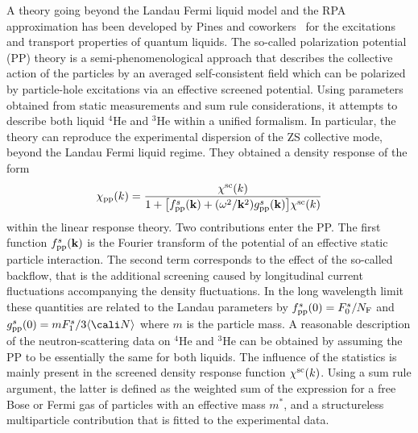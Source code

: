 \documentclass[showpacs,amsmath,twocolumn,floatfix]{revtex4-1}
\begin{document}
A theory going beyond the Landau Fermi liquid model and the RPA approximation
has been developed by Pines and coworkers~\cite{Pin81} for the excitations 
and transport properties of quantum liquids. The so-called polarization 
potential (PP) theory is a semi-phenomenological approach that describes the 
collective action of the particles by an averaged self-consistent field which 
can be polarized by particle-hole excitations via an effective screened 
potential.
Using parameters obtained from static measurements and sum rule considerations, 
it attempts to describe both liquid $^4$He and $^3$He within a unified formalism. 
In particular, the theory can reproduce the experimental dispersion of the ZS 
collective mode, beyond the Landau Fermi liquid regime. They obtained a density 
response of the form
\begin{equation}
 \chi_{{\rm pp}}(k) = \frac{\chi^{\rm sc}(k)}{1 + \big[f^s_{\rm pp}({\bf k}) 
 + (\omega^2/{\bf k}^2) g^s_{\rm pp}({\bf k}) \big] \chi^{\rm sc}(k)}
 \label{eq:chi_c_pp}
\end{equation}
within the linear response theory. Two contributions enter the PP. 
The first function $f^s_{\rm pp}({\bf k})$ is the Fourier transform of the  
potential of an effective static particle interaction. The second term corresponds 
to the effect of the so-called backflow, that is the additional screening caused 
by longitudinal current fluctuations accompanying the density fluctuations. In the 
long wavelength limit these quantities are related to the Landau parameters by 
$f^s_{\rm pp}(0) = F_0^s/N_{\rm F} $ and 
$g^s_{\rm pp}(0) = m F_1^s/3\langle {\cali N} \rangle$ where $m$ is the particle 
mass. A reasonable description of the neutron-scattering data on $^4$He and $^3$He 
can be obtained by assuming the PP to be essentially the same for both liquids. The 
influence of the statistics is mainly present in the screened density response 
function $\chi^{\rm sc}(k)$. Using a sum rule argument, the latter is defined as 
the weighted sum of the expression for a free Bose or Fermi gas of particles with 
an effective mass $m^{*}$, and a structureless multiparticle contribution that is 
fitted to the experimental data.
\end{document}
